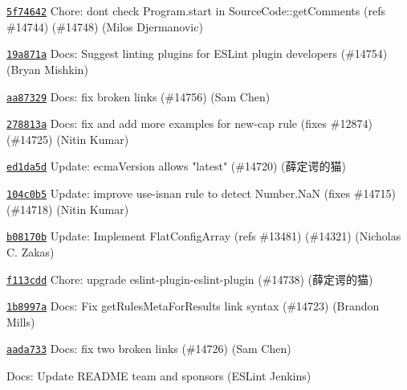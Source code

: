 \begin{DoxyItemize}
\item \href{https://github.com/eslint/eslint/commit/5f746420700d457b92dd86659de588d272937b79}{\texttt{ {\ttfamily 5f74642}}} Chore\+: don\textquotesingle{}t check Program.\+start in Source\+Code\+::get\+Comments (refs \#14744) (\#14748) (Milos Djermanovic)
\item \href{https://github.com/eslint/eslint/commit/19a871a35ae9997ce352624b1081c96c54b73a9f}{\texttt{ {\ttfamily 19a871a}}} Docs\+: Suggest linting plugins for ESLint plugin developers (\#14754) (Bryan Mishkin)
\item \href{https://github.com/eslint/eslint/commit/aa87329d919f569404ca573b439934552006572f}{\texttt{ {\ttfamily aa87329}}} Docs\+: fix broken links (\#14756) (Sam Chen)
\item \href{https://github.com/eslint/eslint/commit/278813a6e759f6b5512ac64c7530c9c51732e692}{\texttt{ {\ttfamily 278813a}}} Docs\+: fix and add more examples for new-\/cap rule (fixes \#12874) (\#14725) (Nitin Kumar)
\item \href{https://github.com/eslint/eslint/commit/ed1da5d96af2587b7211854e45cf8657ef808710}{\texttt{ {\ttfamily ed1da5d}}} Update\+: ecma\+Version allows "{}latest"{} (\#14720) (薛定谔的猫)
\item \href{https://github.com/eslint/eslint/commit/104c0b592f203d315a108d311c58375357e40b24}{\texttt{ {\ttfamily 104c0b5}}} Update\+: improve use-\/isnan rule to detect {\ttfamily Number.\+NaN} (fixes \#14715) (\#14718) (Nitin Kumar)
\item \href{https://github.com/eslint/eslint/commit/b08170b92beb22db6ec612ebdfff930f9e0582ab}{\texttt{ {\ttfamily b08170b}}} Update\+: Implement Flat\+Config\+Array (refs \#13481) (\#14321) (Nicholas C. Zakas)
\item \href{https://github.com/eslint/eslint/commit/f113cdd872257d72bbd66d95e4eaf13623323b24}{\texttt{ {\ttfamily f113cdd}}} Chore\+: upgrade eslint-\/plugin-\/eslint-\/plugin (\#14738) (薛定谔的猫)
\item \href{https://github.com/eslint/eslint/commit/1b8997ab63781f4ebf87e3269400b2ef4c7d2973}{\texttt{ {\ttfamily 1b8997a}}} Docs\+: Fix get\+Rules\+Meta\+For\+Results link syntax (\#14723) (Brandon Mills)
\item \href{https://github.com/eslint/eslint/commit/aada733d2aee830aa32cccb9828cd72db4ccd6bd}{\texttt{ {\ttfamily aada733}}} Docs\+: fix two broken links (\#14726) (Sam Chen)
\item \href{https://github.com/eslint/eslint/commit/8972529f82d13bd04059ee8852b4ebb9b5350962}{\texttt{ {}}} Docs\+: Update README team and sponsors (ESLint Jenkins)
\end{DoxyItemize}

